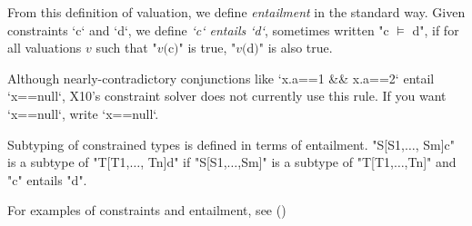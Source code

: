 From this definition of valuation, we define {\em entailment} in the standard
way.  Given constraints \xcd`c` and \xcd`d`, we define {\em \xcd`c` entails
\xcd`d`}, sometimes written \xcdmath"c $\models$ d", if for all valuations
{$v$} such that \xcdmath"$v($c$)$" is true, \xcdmath"$v($d$)$" is also true. 

\limitationx{} Although nearly-contradictory conjunctions 
like \xcd`x.a==1 && x.a==2` entail \xcd`x==null`, X10's constraint solver does
not currently use this rule.  If you want \xcd`x==null`, write \xcd`x==null`.  

Subtyping of constrained types is defined in terms of entailment. 
\xcdmath"S[S1,$\ldots$, Sm]{c}" 
is a subtype of 
\xcdmath"T[T1,$\ldots$, Tn]{d}" 
if \xcdmath"S[S1,$\ldots$,Sm]" is a subtype of \xcdmath"T[T1,$\ldots$,Tn]" and
\xcd"c" entails \xcd"d".

For examples of constraints and entailment, see ()


